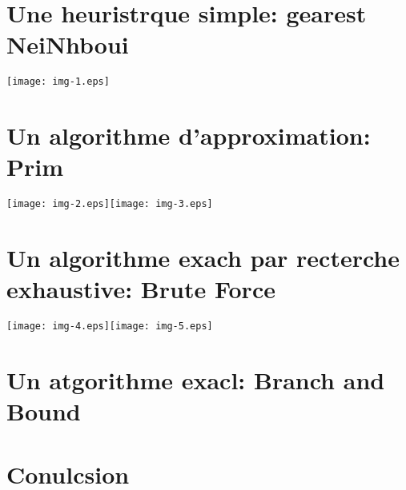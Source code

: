 \documentclass[10pt]{article}
\begin{document}
{\raggedright
\section{Une heuristrque simple: gearest NeiNhboui}
}
\texttt{[image: img-1.eps]}
{\raggedright
\section{Un algorithme d'approximation: Prim}
}
\texttt{[image: img-2.eps]}\texttt{[image: img-3.eps]}
{\raggedright
\section{Un algorithme exach par recterche exhaustive: Brute Force}
}
\texttt{[image: img-4.eps]}\texttt{[image: img-5.eps]}
{\raggedright
\section{Un atgorithme exacl: Branch and Bound}
}

{\raggedright
\section{Conulcsion}
}
\end{document}
